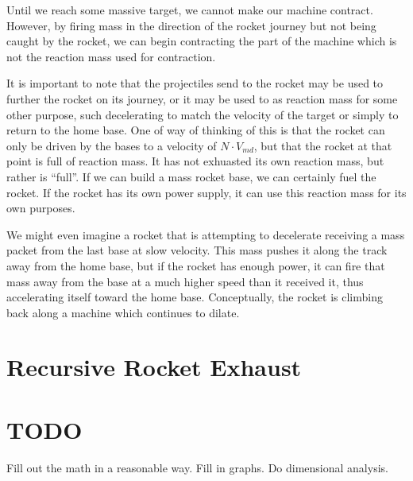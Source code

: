 \documentclass[11pt]{article}
\begin{document}
Until we reach some massive target, we cannot make our machine contract.  However,
by firing mass in the direction of the rocket journey but not being caught by the rocket,
we can begin contracting the part of the machine which is not the reaction mass used
for contraction.

It is important to note that the projectiles send to the rocket may be used to
further the rocket on its journey, or it may be used to as reaction mass for some
other purpose, such decelerating to match the velocity of the target or simply to
return to the home base. One of way of thinking of this is that the rocket
can only be driven by the bases to a velocity of $N \cdot V_{md}$, but that the
rocket at that point is full of reaction mass.  It has not exhuasted its own
reaction mass, but rather is ``full''.  If we can build a mass rocket base,
we can certainly fuel the rocket.  If the rocket has its own power supply, it
can use this reaction mass for its own purposes.

We might even imagine a rocket that is attempting to decelerate receiving
a mass packet from the last base at slow velocity.  This mass pushes it along
the track away from the home base, but if the rocket has enough power, it can
fire that mass away from the base at a much higher speed than it received it,
thus accelerating itself toward the home base. Conceptually, the rocket is
climbing back along a machine which continues to dilate.

\section{Recursive Rocket Exhaust}

\section{TODO}

Fill out the math in a reasonable way.  Fill in graphs. Do dimensional analysis.
\end{document}
